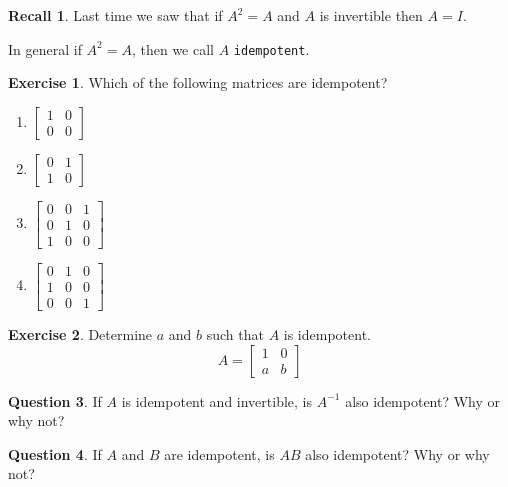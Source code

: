 \documentclass[handout]{beamer}
\newcommand{\fn}{\insertframenumber}
\theoremstyle{definition}
\newtheorem{exercise}{Exercise}
\newtheorem{question}[exercise]{Question}
\newtheorem*{recall}{Recall}
\renewcommand{\emph}[1]{{\color{blue}\texttt{#1}}}
\begin{document}
\begin{frame}{\fn}
	\begin{recall}
		Last time we saw that if $A^2=A$ and $A$ is invertible then $A=I$.  
		
		In general if $A^2=A$, then we call $A$ \emph{idempotent}.
	\end{recall}
	\begin{exercise}
		Which of the following matrices are idempotent?
		\begin{multicols}{2}
			\begin{enumerate}[label=(\alph*)]
				\item $\begin{bmatrix}1&0\\0&0\end{bmatrix}$
				\item $\begin{bmatrix}0&1\\1&0\end{bmatrix}$
				\item $\begin{bmatrix}0&0&1\\0&1&0\\1&0&0\end{bmatrix}$
				\item $\begin{bmatrix}0&1&0\\1&0&0\\0&0&1\end{bmatrix}$
			\end{enumerate}
		\end{multicols}
	\end{exercise}
\end{frame}

\begin{frame}{\fn}
\begin{exercise}
	Determine $a$ and $b$ such that $A$ is idempotent.
	\[A=\begin{bmatrix}1&0\\a&b\end{bmatrix}\]
\end{exercise}
\begin{question}
	If $A$ is idempotent and invertible, is $A^{-1}$ also idempotent? Why or why not?
\end{question}
\begin{question}
	If $A$ and $B$ are idempotent, is $AB$ also idempotent? Why or why not?
\end{question}
\end{frame}
\end{document}
